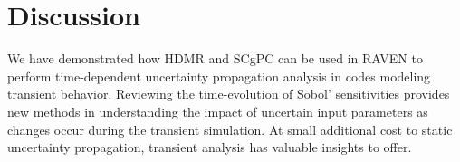 \documentclass{anstrans} \usepackage{amsmath} \usepackage{amssymb}
\begin{document}
\section{Discussion}
We have demonstrated how HDMR and SCgPC can be used in RAVEN to perform time-dependent uncertainty propagation
analysis in codes modeling transient behavior.  Reviewing the time-evolution of Sobol' sensitivities provides
new methods in understanding the impact of uncertain input parameters as changes occur during the transient
simulation.  At small additional cost to static uncertainty propagation, transient analysis has valuable
insights to offer.

{}

\end{document}
